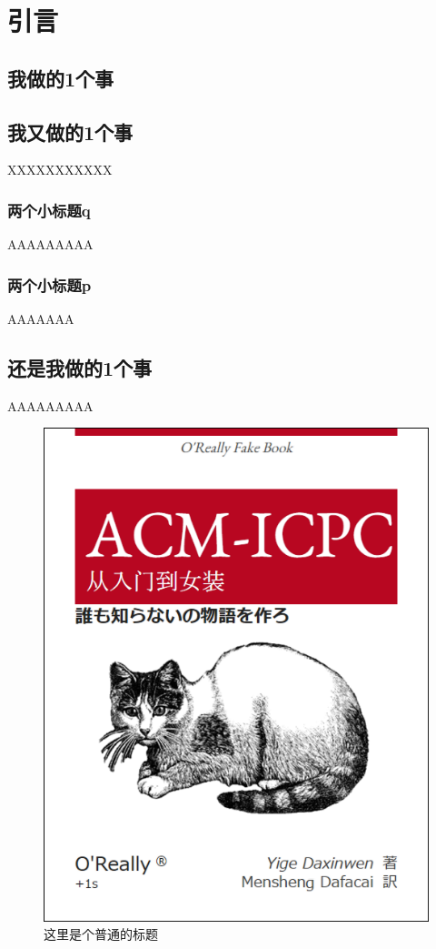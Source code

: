 \chapter*{引言}
\blindtext\cite{NWPUThesisLaTeXTemplate}
\section{我做的1个事}
\blindtext\cite{knuth1986the}\cite{lamport1989latex:}
\section{我又做的1个事}
XXXXXXXXXXX
\subsection{两个小标题q}
AAAAAAAAA
\subsection{两个小标题p}
AAAAAAA
\section{还是我做的1个事}
AAAAAAAAA
\begin{figure}[ht]
	\centering
	\includegraphics[scale=0.6]{figures/figure1.png}
	\caption{
		这里是个普通的标题
	}
	\label{fig:example}
\end{figure}
\endinput